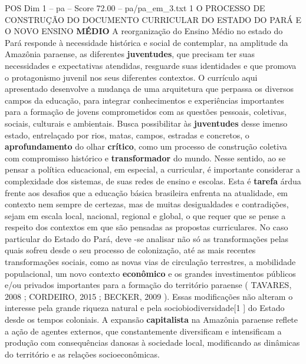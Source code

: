\begin{textsample}{POS Dim 1 – pa – Score 72.00 – pa/pa\_em\_3.txt}  \label{ex:f1_pos_034}
1 O PROCESSO DE CONSTRUÇÃO DO DOCUMENTO CURRICULAR DO ESTADO DO PARÁ E O NOVO ENSINO \textbf{MÉDIO} A reorganização do Ensino Médio no estado do Pará responde à necessidade histórica e social de contemplar, na amplitude da Amazônia paraense, as diferentes \textbf{juventudes}, que precisam ter suas necessidades e expectativas atendidas, resguarde suas identidades e que promova o protagonismo juvenil nos seus diferentes contextos.
O currículo aqui apresentado desenvolve a mudança de uma arquitetura que perpassa os diversos campos da educação, para integrar conhecimentos e experiências importantes para a formação de jovens comprometidos com as questões pessoais, coletivas, sociais, culturais e ambientais.
Busca possibilitar às \textbf{juventudes} desse imenso estado, entrelaçado por rios, matas, campos, estradas e concretos, o \textbf{aprofundamento} do olhar \textbf{crítico}, como um processo de construção coletiva com compromisso histórico e \textbf{transformador} do mundo.
Nesse sentido, ao se pensar a política educacional, em especial, a curricular, é importante considerar a complexidade dos sistemas, de suas redes de ensino e escolas.
Esta é \textbf{tarefa} árdua frente aos desafios que a educação básica brasileira enfrenta na atualidade, em contexto nem sempre de certezas, mas de muitas desigualdades e contradições, sejam em escala local, nacional, regional e global, o que requer que se pense a respeito dos contextos em que são pensadas as propostas curriculares.
No caso particular do Estado do Pará, deve -se analisar não só as transformações pelas quais sofreu desde o seu processo de colonização, até as mais recentes transformações sociais, como as novas vias de circulação terrestres, a mobilidade populacional, um novo contexto \textbf{econômico} e os grandes investimentos públicos e/ou privados importantes para a formação do território paraense ( TAVARES, 2008 ; CORDEIRO, 2015 ; BECKER, 2009 ).
Essas modificações não alteram o interesse pela grande riqueza natural e pela sociobiodiversidade[1 ] do Estado desde os tempos coloniais.
A expansão \textbf{capitalista} na Amazônia paraense reflete a ação de agentes externos, que constantemente diversificam e intensificam a produção com consequências danosas à sociedade local, modificando as dinâmicas do território e as relações socioeconômicas.

\end{textsample}
